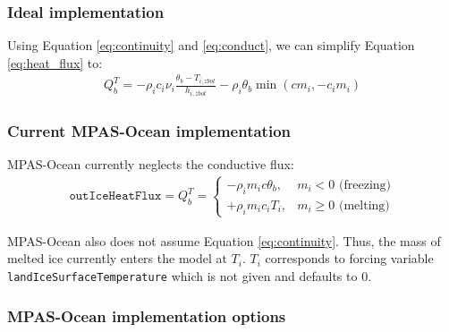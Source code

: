 \documentclass[11pt]{report}
\newcommand{\bea}{\begin{eqnarray}}
\newcommand{\eea}{\end{eqnarray}}
\begin{document}
\subsubsection{Ideal implementation}

Using Equation \ref{eq:continuity} and \ref{eq:conduct}, we can simplify Equation \ref{eq:heat_flux} to:
\bea
    Q_b^T = - \rho_i c_i \nu_i \frac{\theta_b - T_{i,zbot}}{h_{i,zbot}} -\rho_i \theta_b \min(c m_i, - c_i m_i)\label{eq:heat_flux}
\eea

\subsubsection{Current MPAS-Ocean implementation}

MPAS-Ocean currently neglects the conductive flux:
\bea
    \texttt{outIceHeatFlux} = Q_b^T =     \begin{cases}
        -\rho_i m_i c \theta_b, &m_i < 0 \text{ (freezing)}\\
        +\rho_i m_i c_i T_i, &m_i \ge 0 \text{ (melting)}
    \end{cases}
\eea

MPAS-Ocean also does not assume Equation \ref{eq:continuity}. Thus, the mass of melted ice currently enters the model at $T_i$. $T_i$ corresponds to forcing variable \texttt{landIceSurfaceTemperature} which is not given and defaults to 0.

\subsubsection{MPAS-Ocean implementation options}
\end{document}
